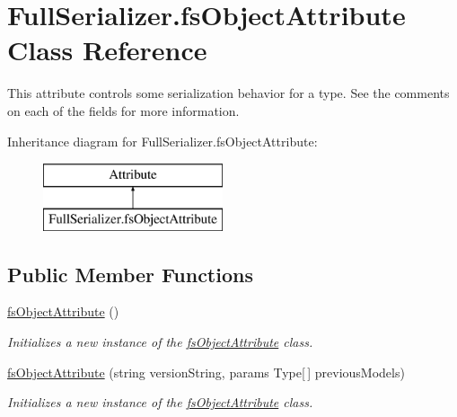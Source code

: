 \hypertarget{class_full_serializer_1_1fs_object_attribute}{}\section{Full\+Serializer.\+fs\+Object\+Attribute Class Reference}
\label{class_full_serializer_1_1fs_object_attribute}


This attribute controls some serialization behavior for a type. See the comments on each of the fields for more information.  


Inheritance diagram for Full\+Serializer.\+fs\+Object\+Attribute\+:\begin{figure}[H]
\begin{center}
\leavevmode
\includegraphics[height=2.000000cm]{class_full_serializer_1_1fs_object_attribute}
\end{center}
\end{figure}
\subsection*{Public Member Functions}
\begin{DoxyCompactItemize}
\item 
\hyperlink{class_full_serializer_1_1fs_object_attribute_aacbca55a78b850772602f27cfb787830}{fs\+Object\+Attribute} ()
\begin{DoxyCompactList}\small\item\em Initializes a new instance of the \hyperlink{class_full_serializer_1_1fs_object_attribute}{fs\+Object\+Attribute} class. \end{DoxyCompactList}\item 
\hyperlink{class_full_serializer_1_1fs_object_attribute_ab9564673f276f2e8b7b3865573abcce4}{fs\+Object\+Attribute} (string version\+String, params Type\mbox{[}$\,$\mbox{]} previous\+Models)
\begin{DoxyCompactList}\small\item\em Initializes a new instance of the \hyperlink{class_full_serializer_1_1fs_object_attribute}{fs\+Object\+Attribute} class. \end{DoxyCompactList}\end{DoxyCompactItemize}

